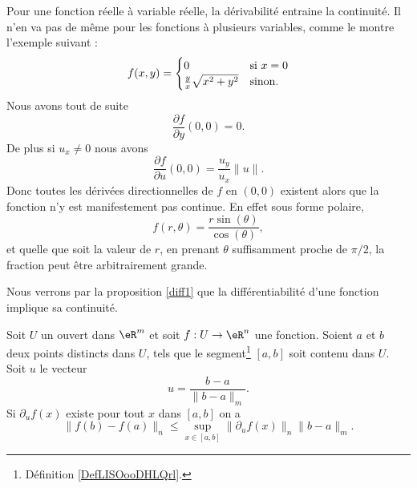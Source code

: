 \begin{example}
    Pour une fonction réelle à variable réelle, la dérivabilité entraine la continuité. Il n'en va pas de même pour les fonctions à plusieurs variables, comme le montre l'exemple suivant :
    \begin{equation}
        f(x,y)=\begin{cases}
            0    &   \text{si \( x=0\)}\\
            \frac{ y }{ x }\sqrt{x^2+y^2}    &    \text{sinon.}
        \end{cases}
    \end{equation}
    Nous avons tout de suite
    \begin{equation}
        \frac{ \partial f }{ \partial y }(0,0)=0.
    \end{equation}
    De plus si \( u_x\neq 0\) nous avons
    \begin{equation}
            \frac{ \partial f }{ \partial u }(0,0)=\frac{ u_y }{ u_x }\| u \|.
    \end{equation}
    Donc toutes les dérivées directionnelles de \( f\) en \( (0,0)\) existent alors que la fonction n'y est manifestement pas continue. En effet sous forme polaire,
    \begin{equation}
        f(r,\theta)=\frac{ r\sin(\theta) }{ \cos(\theta) },
    \end{equation}
    et quelle que soit la valeur de \( r\), en prenant \( \theta\) suffisamment proche de \( \pi/2\), la fraction peut être arbitrairement grande.

    Nous verrons par la proposition \ref{diff1} que la différentiabilité d'une fonction implique sa continuité.
\end{example}

\begin{theorem}\label{val_medio_1}		
    Soit $U$ un ouvert dans $\eR^m$ et soit $f:U\to\eR^n$ une fonction. Soient $a$ et $b$ deux points distincts dans $U$, tels que le segment\footnote{Définition \ref{DefLISOooDHLQrl}.} $[a,b]$ soit contenu dans $U$. Soit $u$ le vecteur 
	\[
		u=\frac{b-a}{\|b-a\|_m}.
	\] 
	Si $\partial_u f(x)$ existe pour tout $x$ dans $[a,b]$ on a
	\[
		\|f(b)-f(a)\|_n\leq \sup_{x\in[a,b]}\|\partial_uf(x)\|_n\|b-a\|_m.
	\]
\end{theorem}


